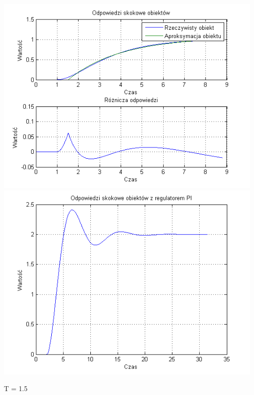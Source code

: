 \documentclass[10pt,a4paper]{article}
\begin{document}
\begin{center}
\includegraphics[scale=1]{images/jeden/skrypt_61.png}\\
\includegraphics[scale=1]{images/jeden/skrypt_62.png}\\
\end{center}
\newpage
T = 1.5
\end{document}
